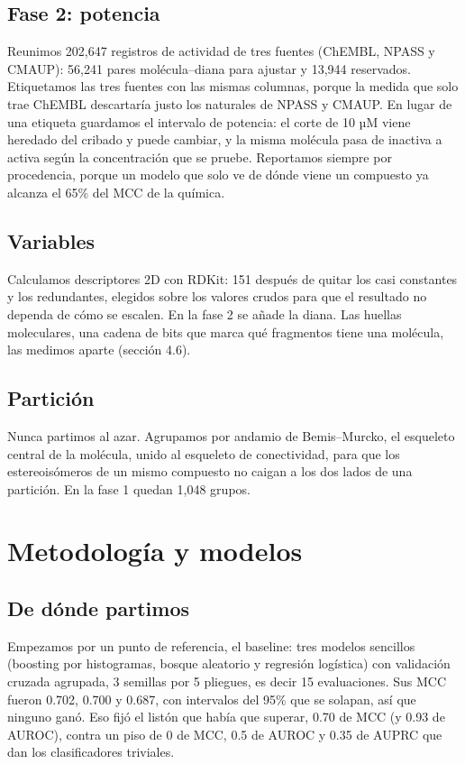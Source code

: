 \documentclass[letterpaper,11pt]{article}
\begin{document}
\subsection{Fase 2: potencia}

Reunimos 202,647 registros de actividad de tres fuentes (ChEMBL, NPASS y CMAUP): 56,241 pares molécula--diana para ajustar y 13,944 reservados. Etiquetamos las tres fuentes con las mismas columnas, porque la medida que solo trae ChEMBL descartaría justo los naturales de NPASS y CMAUP. En lugar de una etiqueta guardamos el intervalo de potencia: el corte de 10 µM viene heredado del cribado y puede cambiar, y la misma molécula pasa de inactiva a activa según la concentración que se pruebe. Reportamos siempre por procedencia, porque un modelo que solo ve de dónde viene un compuesto ya alcanza el 65\% del MCC de la química.

\subsection{Variables}

Calculamos descriptores 2D con RDKit: 151 después de quitar los casi constantes y los redundantes, elegidos sobre los valores crudos para que el resultado no dependa de cómo se escalen. En la fase 2 se añade la diana. Las huellas moleculares, una cadena de bits que marca qué fragmentos tiene una molécula, las medimos aparte (sección 4.6).

\subsection{Partición}

Nunca partimos al azar. Agrupamos por andamio de Bemis--Murcko, el esqueleto central de la molécula, unido al esqueleto de conectividad, para que los estereoisómeros de un mismo compuesto no caigan a los dos lados de una partición. En la fase 1 quedan 1,048 grupos.

\section{Metodología y modelos}
\subsection{De dónde partimos}

Empezamos por un punto de referencia, el baseline: tres modelos sencillos (boosting por histogramas, bosque aleatorio y regresión logística) con validación cruzada agrupada, 3 semillas por 5 pliegues, es decir 15 evaluaciones. Sus MCC fueron 0.702, 0.700 y 0.687, con intervalos del 95\% que se solapan, así que ninguno ganó. Eso fijó el listón que había que superar, 0.70 de MCC (y 0.93 de AUROC), contra un piso de 0 de MCC, 0.5 de AUROC y 0.35 de AUPRC que dan los clasificadores triviales.
\end{document}
